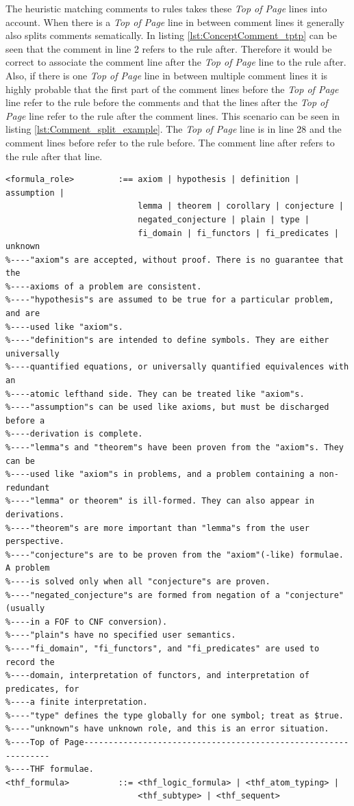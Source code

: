 The heuristic matching comments to rules takes these \textit{Top of Page} lines into account.
When there is a \textit{Top of Page} line in between comment lines it generally also splits comments sematically. In listing \ref{lst:ConceptComment_tptp} can be seen that the comment in line 2 refers to the rule after.
Therefore it would be correct to associate the comment line after the \textit{Top of Page} line to the rule after.
Also, if there is one \textit{Top of Page} line in between multiple comment lines it is highly probable that the first part of the comment lines before the \textit{Top of Page} line refer to the rule before the comments and that the lines after the \textit{Top of Page} line refer to the rule after the comment lines.
This scenario can be seen in listing \ref{lst:Comment_split_example}.
The \textit{Top of Page} line is in line 28 and the comment lines before refer to the rule before.
The comment line after refers to the rule after that line.
\begin{lstlisting}[language=none, basicstyle=\scriptsize	,caption=Comment lines split by a \textit{Top of Page} line in the \ac{TPTP} syntax,label= lst:Comment_split_example]
<formula_role>         :== axiom | hypothesis | definition | assumption |
                           lemma | theorem | corollary | conjecture |
                           negated_conjecture | plain | type |
                           fi_domain | fi_functors | fi_predicates | unknown
%----"axiom"s are accepted, without proof. There is no guarantee that the
%----axioms of a problem are consistent.
%----"hypothesis"s are assumed to be true for a particular problem, and are
%----used like "axiom"s.
%----"definition"s are intended to define symbols. They are either universally
%----quantified equations, or universally quantified equivalences with an
%----atomic lefthand side. They can be treated like "axiom"s.
%----"assumption"s can be used like axioms, but must be discharged before a
%----derivation is complete.
%----"lemma"s and "theorem"s have been proven from the "axiom"s. They can be
%----used like "axiom"s in problems, and a problem containing a non-redundant
%----"lemma" or theorem" is ill-formed. They can also appear in derivations.
%----"theorem"s are more important than "lemma"s from the user perspective.
%----"conjecture"s are to be proven from the "axiom"(-like) formulae. A problem
%----is solved only when all "conjecture"s are proven.
%----"negated_conjecture"s are formed from negation of a "conjecture" (usually
%----in a FOF to CNF conversion).
%----"plain"s have no specified user semantics.
%----"fi_domain", "fi_functors", and "fi_predicates" are used to record the
%----domain, interpretation of functors, and interpretation of predicates, for
%----a finite interpretation.
%----"type" defines the type globally for one symbol; treat as $true.
%----"unknown"s have unknown role, and this is an error situation.
%----Top of Page---------------------------------------------------------------
%----THF formulae.
<thf_formula>          ::= <thf_logic_formula> | <thf_atom_typing> |
                           <thf_subtype> | <thf_sequent>
\end{lstlisting}

